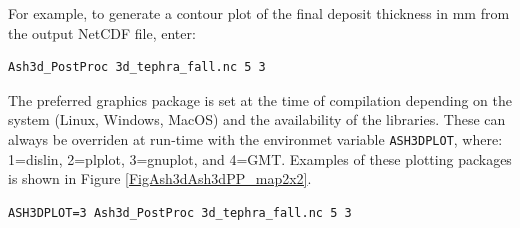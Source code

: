 \normalsize
For example, to generate a contour plot of the final deposit thickness in $\mathrm{mm}$
from the output NetCDF file, enter:
\small
\begin{verbatim}
Ash3d_PostProc 3d_tephra_fall.nc 5 3
\end{verbatim}
\normalsize

The preferred graphics package is set at the time of compilation depending on the
system (Linux, Windows, MacOS) and the availability of the libraries. These can
always be overriden at run-time with the environmet variable \texttt{ASH3DPLOT},
where: 1=dislin, 2=plplot, 3=gnuplot, and 4=GMT. Examples of these plotting packages
is shown in Figure \ref{FigAsh3dAsh3dPP_map2x2}.

\small
\begin{verbatim}
ASH3DPLOT=3 Ash3d_PostProc 3d_tephra_fall.nc 5 3
\end{verbatim}
\normalsize

